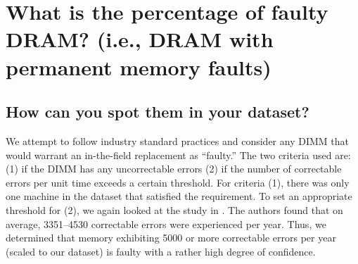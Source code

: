 \section{What is the percentage of faulty DRAM?  (i.e., DRAM with permanent
memory faults) }

\subsection{How can you spot them in your dataset?}
We attempt to follow industry standard practices and consider any DIMM that
would warrant an in-the-field replacement as ``faulty.''  The two criteria used
are: (1) if the DIMM has any uncorrectable errors (2) if the number of
correctable errors per unit time exceeds a certain threshold.  For criteria (1),
there was only one machine in the dataset that satisfied the requirement.  To
set an appropriate threshold for (2), we again looked at the study in
\cite{schroeder2009dram}.  The authors found that on average, 3351--4530
correctable errors were experienced per year.  Thus, we determined that memory
exhibiting 5000 or more correctable errors per year (scaled to our dataset) is
faulty with a rather high degree of confidence.

